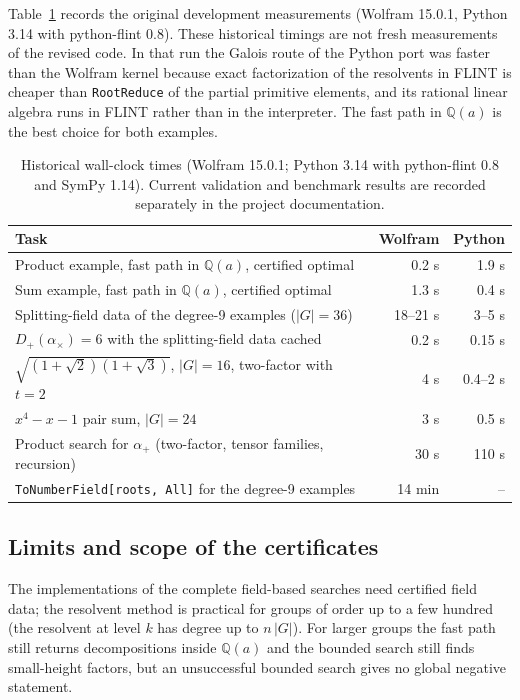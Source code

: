 \documentclass[11pt,a4paper]{article}
\theoremstyle{definition}
\theoremstyle{remark}
\newcommand{\Q}{\mathbb{Q}}
\newcommand{\Dp}{D_{+}}
\newcommand{\code}[1]{\texttt{#1}}
\begin{document}
Table~\ref{tab:timing} records the original development measurements (Wolfram 15.0.1, Python 3.14
with python-flint 0.8).  These historical timings are not fresh measurements of the revised code.
In that run the Galois route of the Python port was faster than the Wolfram kernel because
exact factorization of the resolvents in FLINT is cheaper than \code{RootReduce} of the partial primitive
elements, and its rational linear algebra runs in FLINT rather than in the interpreter.  The fast path
in $\Q(a)$ is the best choice for both examples.

\begin{table}[htbp]
\centering\small
\begin{tabular}{@{}lrr@{}}
\toprule
Task & Wolfram & Python\\
\midrule
Product example, fast path in $\Q(a)$, certified optimal & 0.2 s & 1.9 s\\
Sum example, fast path in $\Q(a)$, certified optimal & 1.3 s & 0.4 s\\
Splitting-field data of the degree-9 examples ($|G|=36$) & 18--21 s & 3--5 s\\
$\Dp(\alpha_\times)=6$ with the splitting-field data cached & 0.2 s & 0.15 s\\
$\sqrt{(1+\sqrt2)(1+\sqrt3)}$, $|G|=16$, two-factor with $t=2$ & 4 s & 0.4--2 s\\
$x^4-x-1$ pair sum, $|G|=24$ & 3 s & 0.5 s\\
Product search for $\alpha_+$ (two-factor, tensor families, recursion) & 30 s & 110 s\\
\code{ToNumberField[roots, All]} for the degree-9 examples & 14 min & --\\
\bottomrule
\end{tabular}
\caption{Historical wall-clock times (Wolfram 15.0.1; Python 3.14 with python-flint 0.8 and SymPy 1.14).
Current validation and benchmark results are recorded separately in the project documentation.}\label{tab:timing}
\end{table}

\subsection{Limits and scope of the certificates}

The implementations of the complete field-based searches need certified field data; the resolvent method is practical for groups of order
up to a few hundred (the resolvent at level $k$ has degree up to $n\,|G|$).  For larger groups the fast
path still returns decompositions inside $\Q(a)$ and the bounded search still finds small-height
factors, but an unsuccessful bounded search gives no global negative statement.
\end{document}
